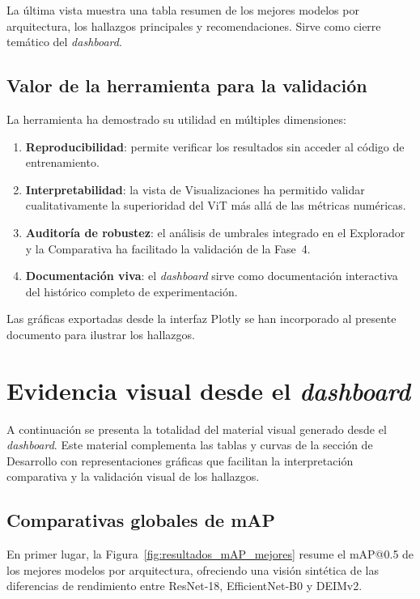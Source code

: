 La última vista muestra una tabla resumen de los mejores modelos por arquitectura, los hallazgos principales y recomendaciones. Sirve como cierre temático del \textit{dashboard}.

\subsection{Valor de la herramienta para la validación}

La herramienta ha demostrado su utilidad en múltiples dimensiones:
\begin{enumerate}
    \item \textbf{Reproducibilidad}: permite verificar los resultados sin acceder al código de entrenamiento.
    \item \textbf{Interpretabilidad}: la vista de Visualizaciones ha permitido validar cualitativamente la superioridad del \acrshort{ViT} más allá de las métricas numéricas.
    \item \textbf{Auditoría de robustez}: el análisis de umbrales integrado en el Explorador y la Comparativa ha facilitado la validación de la Fase~4.
    \item \textbf{Documentación viva}: el \textit{dashboard} sirve como documentación interactiva del histórico completo de experimentación.
\end{enumerate}
Las gráficas exportadas desde la interfaz Plotly se han incorporado al presente documento para ilustrar los hallazgos.


\section{Evidencia visual desde el \textit{dashboard}}
\label{sec:evidencia_visual}

A continuación se presenta la totalidad del material visual generado desde el \textit{dashboard}. Este material complementa las tablas y curvas de la sección de Desarrollo con representaciones gráficas que facilitan la interpretación comparativa y la validación visual de los hallazgos.

\subsection{Comparativas globales de mAP}

En primer lugar, la Figura~\ref{fig:resultados_mAP_mejores} resume el mAP@0.5 de los mejores modelos por arquitectura, ofreciendo una visión sintética de las diferencias de rendimiento entre ResNet-18, EfficientNet-B0 y DEIMv2.

